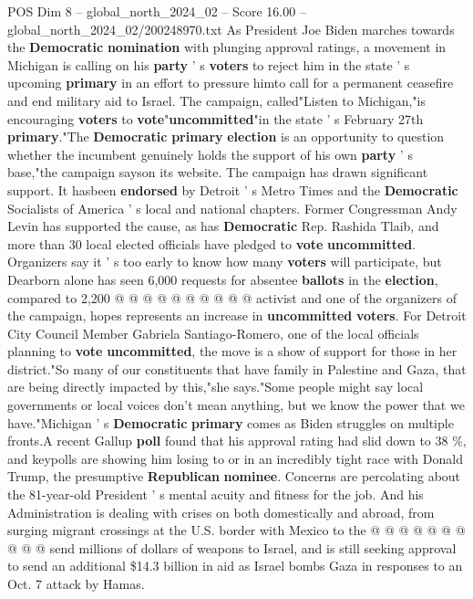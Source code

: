\begin{textsample}{POS Dim 8 – global\_north\_2024\_02 – Score 16.00 – global\_north\_2024\_02/200248970.txt}  \label{ex:f8_pos_023}
As President Joe Biden marches towards the \textbf{Democratic} \textbf{nomination} with plunging approval ratings, a movement in Michigan is calling on his \textbf{party} ' s \textbf{voters} to reject him in the state ' s upcoming \textbf{primary} in an effort to pressure himto call for a permanent ceasefire and end military aid to Israel.
The campaign, called"Listen to Michigan,"is encouraging \textbf{voters} to \textbf{vote}"\textbf{uncommitted}"in the state ' s February 27th \textbf{primary}."The \textbf{Democratic} \textbf{primary} \textbf{election} is an opportunity to question whether the incumbent genuinely holds the support of his own \textbf{party} ' s base,"the campaign sayson its website.
The campaign has drawn significant support.
It hasbeen \textbf{endorsed} by Detroit ' s Metro Times and the \textbf{Democratic} Socialists of America ' s local and national chapters.
Former Congressman Andy Levin has supported the cause, as has \textbf{Democratic} Rep.
Rashida Tlaib, and more than 30 local elected officials have pledged to \textbf{vote} \textbf{uncommitted}.
Organizers say it ' s too early to know how many \textbf{voters} will participate, but Dearborn alone has seen 6,000 requests for absentee \textbf{ballots} in the \textbf{election}, compared to 2,200 @ @ @ @ @ @ @ @ @ @ activist and one of the organizers of the campaign, hopes represents an increase in \textbf{uncommitted} \textbf{voters}.
For Detroit City Council Member Gabriela Santiago-Romero, one of the local officials planning to \textbf{vote} \textbf{uncommitted}, the move is a show of support for those in her district."So many of our constituents that have family in Palestine and Gaza, that are being directly impacted by this,"she says."Some people might say local governments or local voices don't mean anything, but we know the power that we have."Michigan ' s \textbf{Democratic} \textbf{primary} comes as Biden struggles on multiple fronts.A recent Gallup \textbf{poll} found that his approval rating had slid down to 38 \%, and keypolls are showing him losing to or in an incredibly tight race with Donald Trump, the presumptive \textbf{Republican} \textbf{nominee}.
Concerns are percolating about the 81-year-old President ' s mental acuity and fitness for the job.
And his Administration is dealing with crises on both domestically and abroad, from surging migrant crossings at the U.S. border with Mexico to the @ @ @ @ @ @ @ @ @ @ send millions of dollars of weapons to Israel, and is still seeking approval to send an additional \$14.3 billion in aid as Israel bombs Gaza in responses to an Oct. 7 attack by Hamas.

\end{textsample}
